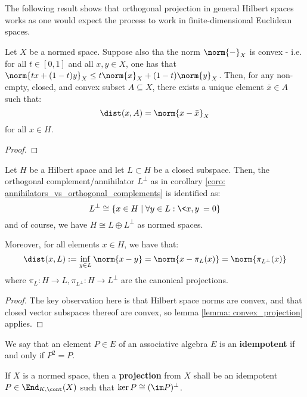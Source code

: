         The following result shows that orthogonal projection in general Hilbert spaces works as one would expect the process to work in finite-dimensional Euclidean spaces.
        \begin{lemma} \label{lemma: convex_projection}
            Let $X$ be a normed space. Suppose also tha the norm $\norm{-}_X$ is convex - i.e. for all $t \in [0, 1]$ and all $x, y \in X$, one has that $\norm{ t x + (1 - t) y }_X \leq t \norm{x}_X + (1 - t) \norm{y}_X$. Then, for any non-empty, closed, and convex subset $A \subseteq X$, there exists a unique element $\bar{x} \in A$ such that:
                $$\dist(x, A) = \norm{x - \bar{x}}_X$$
            for all $x \in H$.
        \end{lemma}
            \begin{proof}
            \end{proof}
        \begin{proposition} \label{prop: orthogonal_projections_onto_closed_subspaces_in_hilbert_spaces}
            Let $H$ be a Hilbert space and let $L \subset H$ be a closed subspace. Then, the orthogonal complement/annihilator $L^{\perp}$ as in corollary \ref{coro: annihilators_vs_orthogonal_complements} is identified as:
                $$L^{\perp} \cong \{ x \in H \mid \forall y \in L: \<x, y\> = 0 \}$$
            and of course, we have $H \cong L \oplus L^{\perp}$ as normed spaces.

            Moreover, for all elements $x \in H$, we have that:
                $$\dist(x, L) := \inf_{y \in L} \norm{x - y} = \norm{x - \pi_L(x)} = \norm{\pi_{L^{\perp}}(x)}$$
            where $\pi_L: H \to L, \pi_{L^{\perp}}: H \to L^{\perp}$ are the canonical projections.
        \end{proposition}
            \begin{proof}
                The key observation here is that Hilbert space norms are convex, and that closed vector subspaces thereof are convex, so lemma \ref{lemma: convex_projection} applies.
            \end{proof}
        \begin{definition} \label{def: projections}
            We say that an element $P \in E$ of an associative algebra $E$ is an \textbf{idempotent} if and only if $P^2 = P$.
            
            If $X$ is a normed space, then a \textbf{projection} from $X$ shall be an idempotent $P \in \End_{K, \cont}(X)$ such that $\ker P \cong (\im P)^{\perp}$.
        \end{definition}
